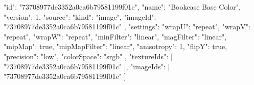 {
  "id": "73708977de3352a0ca6b79581199f01c",
  "name": "Bookcase Base Color",
  "version": 1,
  "source": {
    "kind": "image",
    "imageId": "73708977de3352a0ca6b79581199f01c"
  },
  "settings": {
    "wrapU": "repeat",
    "wrapV": "repeat",
    "wrapW": "repeat",
    "minFilter": "linear",
    "magFilter": "linear",
    "mipMap": true,
    "mipMapFilter": "linear",
    "anisotropy": 1,
    "flipY": true,
    "precision": "low",
    "colorSpace": "srgb"
  },
  "textureIds": [
    "73708977de3352a0ca6b79581199f01c"
  ],
  "imageIds": [
    "73708977de3352a0ca6b79581199f01c"
  ]
}
